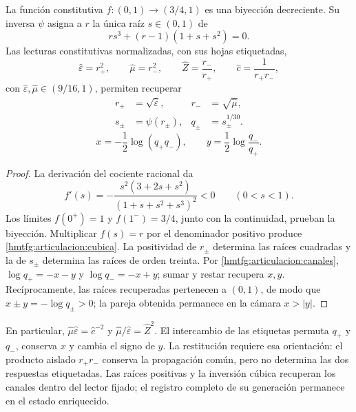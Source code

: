\begin{proposition}
\label{hmtfg:articulacion:inversion}
La función constitutiva \(f:(0,1)\to(3/4,1)\) es una biyección
decreciente. Su inversa \(\psi\) asigna a \(r\) la única raíz
\(s\in(0,1)\) de
\begin{equation}
 r s^3+(r-1)(1+s+s^2)=0.
 \label{hmtfg:articulacion:cubica}
\end{equation}
Las lecturas constitutivas normalizadas, con sus hojas etiquetadas,
\[
 \widehat\varepsilon=r_+^2,\qquad
 \widehat\mu=r_-^2,\qquad
 \widehat Z=\frac{r_-}{r_+},\qquad
 \widehat c=\frac1{r_+r_-},
\]
con \(\widehat\varepsilon,\widehat\mu\in(9/16,1)\), permiten recuperar
\begin{equation}
 \begin{aligned}
 r_+&=\sqrt{\widehat\varepsilon},&
 r_-&=\sqrt{\widehat\mu},\\
 s_\pm&=\psi(r_\pm),& q_\pm&=s_\pm^{1/30}.
 \end{aligned}
 \label{hmtfg:articulacion:recuperacion-canales}
\end{equation}
\begin{equation}
 x=-\frac12\log(q_+q_-),\qquad
 y=\frac12\log\frac{q_-}{q_+}.
 \label{hmtfg:articulacion:recuperacion-angular}
\end{equation}
\end{proposition}
\begin{proof}
La derivación del cociente racional da
\begin{equation}
 f'(s)=-\frac{s^2(3+2s+s^2)}{(1+s+s^2+s^3)^2}<0
 \qquad(0<s<1).
 \label{hmtfg:articulacion:monotonia}
\end{equation}
Los límites \(f(0^+)=1\) y \(f(1^-)=3/4\), junto con la
continuidad, prueban la biyección. Multiplicar \(f(s)=r\) por
el denominador positivo produce \eqref{hmtfg:articulacion:cubica}.
La positividad de \(r_\pm\) determina las raíces cuadradas
y la de \(s_\pm\) determina las raíces de orden treinta.
Por \eqref{hmtfg:articulacion:canales},
\(\log q_+=-x-y\) y \(\log q_-=-x+y\);
sumar y restar recupera \(x,y\).
Recíprocamente, las raíces recuperadas pertenecen a \((0,1)\),
de modo que \(x\pm y=-\log q_\pm>0\); la pareja obtenida
permanece en la cámara \(x>|y|\).
\end{proof}

En particular,
\(\widehat\mu\widehat\varepsilon=\widehat c^{-2}\) y
\(\widehat\mu/\widehat\varepsilon=\widehat Z^2\).
El intercambio de las etiquetas permuta \(q_+\) y \(q_-\),
conserva \(x\) y cambia el signo de \(y\). La restitución
requiere esa orientación: el producto aislado \(r_+r_-\)
conserva la propagación común, pero no determina las dos respuestas
etiquetadas. Las raíces positivas y la inversión cúbica recuperan
los canales dentro del lector fijado; el registro completo de su
generación permanece en el estado enriquecido.

